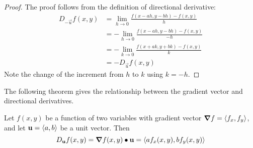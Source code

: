 \documentclass[handout]{ximera}
\begin{document}
\begin{proof}
The proof follows from the definition of directional derivative:
\begin{align*}
D_{-\vec u} f(x,y) &= \lim_{h \to 0} \frac{f(x - ah, y - bh) -f(x,y)}{h} \\
                   &= -\lim_{h \to 0} \frac{f(x - ah, y - bh) -f(x,y)}{-h} \\
                   &= -\lim_{k \to 0} \frac{f(x + ak, y  + bk) -f(x,y)}{k} \\
                   &= -D_{\vec u} f(x,y)
\end{align*}
Note the change of the increment from $h$ to $k$ using $k = -h$.
\end{proof}

The following theorem gives the relationship between the gradient vector and directional derivatives.

\begin{theorem}
Let $f(x,y)$ be a function of two variables with gradient vector $\boldsymbol\nabla f = \left\langle f_x, f_y\right\rangle$, 
and let $\mathbf u = \left\langle a,b\right\rangle$ be a unit vector.
Then
\[
D_{\mathbf u} f(x,y) = \boldsymbol\nabla f(x,y) \bullet \mathbf u = \left\langle af_x(x,y), bf_y(x,y)\right\rangle
\]
\end{theorem}
\end{document}
